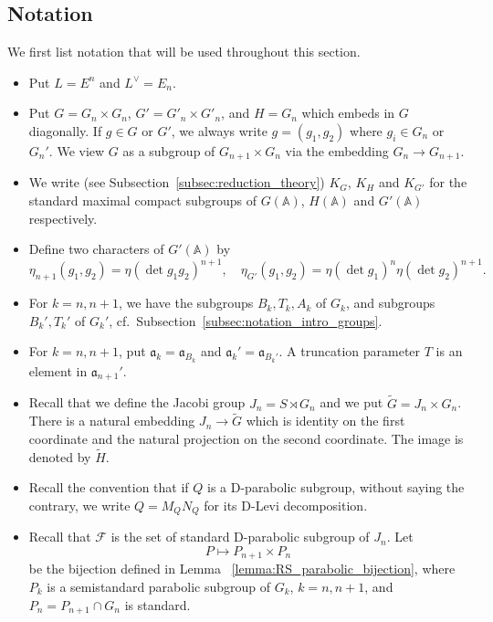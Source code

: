 \documentclass[letterpaper,11pt]{amsart}
\newcommand{\fa}{\mathfrak{a}}
\newcommand{\bA}{\mathbb{A}}
\newcommand{\cF}{\mathcal{F}}
\newcommand{\<}{\negthickspace}
\theoremstyle{definition}
\theoremstyle{plain}
\theoremstyle{remark}
\numberwithin{equation}{section}
\begin{document}
\subsection{Notation} \label{subsec:main_thm_spectral}
We first list notation that will be used throughout this section.
\begin{itemize}
\item Put $L = E^n$ and $L^\vee = E_n$.

\item Put $G = G_n \times G_n$, $G' = G'_n \times G'_n$, and
    $H = G_n$ which embeds in $G$ diagonally.
    If $g \in G$ or $G'$, we always write $g =
    (g_1, g_2)$ where $g_i \in G_n$ or $G_n'$. We view $G$ as a subgroup of
    $G_{n+1} \times G_n$ via the embedding $G_n \to G_{n+1}$.

\item We write (see Subsection~\ref{subsec:reduction_theory}) $K_G$, $K_H$ and $K_{G'}$ for the standard maximal compact subgroups of $G(\bA)$, $H(\bA)$ and $G'(\bA)$ respectively.

\item Define two characters of $G'(\bA)$ by
\begin{equation}
\label{eq:eta_defi}
      \eta_{n+1}(g_1, g_2) = \eta(\det g_1 g_2)^{n+1}, \quad
    \eta_{G'}(g_1, g_2) = \eta(\det g_1)^{n} \eta(\det g_2)^{n+1}.
\end{equation}

\item For $k = n, n+1$, we have the subgroups $B_k, T_k, A_k$ of $G_k$, and subgroups
    $B_k', T_k'$ of $G_k'$, cf.~Subsection~\ref{subsec:notation_intro_groups}.

\item For $k=n,n+1$, put $\fa_{k} = \fa_{B_{k}}$ and $\fa_{k}' = \fa_{B_k'}$.
    A truncation parameter $T$ is an element in $\fa_{n+1}'$.

\item Recall that we define the Jacobi group $J_n = S \rtimes G_n$ and we put
    $\widetilde{G} = J_n \times G_n$. There is a natural embedding
    $J_n \to \widetilde{G}$ which is identity on the first coordinate and the
    natural projection on the second coordinate. The image is denoted by
    $\widetilde{H}$.

\item Recall the convention that if $Q$ is a D-parabolic subgroup, without saying
    the contrary, we write $Q = M_Q N_Q$ for its D-Levi decomposition.

\item  Recall that $\cF$ is the set of standard D-parabolic subgroup of $J_n$.
    Let
        \[
        P \mapsto P_{n+1} \times P_n
        \]
    be the bijection defined in Lemma ~\ref{lemma:RS_parabolic_bijection}, where
    $P_{k}$ is a semistandard parabolic subgroup of $G_{k}$, $k= n, n+1$, and
    $P_n = P_{n+1} \cap G_n$ is standard.


\end{itemize}
\end{document}
